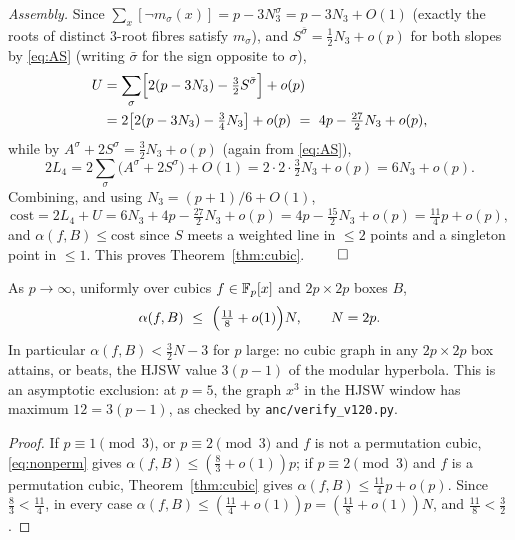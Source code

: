 \smallskip\noindent\emph{Assembly.} Since $\sum_x[\neg m_\sigma(x)]=p-3N_3^\sigma=p-3N_3+O(1)$ (exactly the roots of
distinct $3$-root fibres satisfy $m_\sigma$), and $S^{\bar\sigma}=\tfrac12N_3+o(p)$
for both slopes by \eqref{eq:AS} (writing $\bar\sigma$ for the sign opposite to $\sigma$),
\begin{align*}
U&=\sum_\sigma\Bigl[2(p-3N_3)-\tfrac32S^{\bar\sigma}\Bigr]+o(p)\\
&=2\bigl[2(p-3N_3)-\tfrac34N_3\bigr]+o(p)\ =\ 4p-\tfrac{27}2N_3+o(p),
\end{align*}
while by $A^\sigma+2S^\sigma=\tfrac32N_3+o(p)$ (again from \eqref{eq:AS}),
\[
2L_4=2\sum_\sigma\bigl(A^\sigma+2S^\sigma\bigr)+O(1)=2\cdot2\cdot\tfrac32N_3+o(p)=6N_3+o(p).
\]
Combining, and using $N_3=(p+1)/6+O(1)$,
\[
\mathrm{cost}=2L_4+U=6N_3+4p-\tfrac{27}2N_3+o(p)=4p-\tfrac{15}2N_3+o(p)=\tfrac{11}4p+o(p),
\]
and $\alpha(f,B)\le\mathrm{cost}$ since $S$ meets a weighted line in $\le2$ points and a singleton point in $\le1$.
This proves Theorem~\ref{thm:cubic}. $\qed$

\begin{corollary}\label{cor:cubic}
As $p\to\infty$, uniformly over cubics $f\in\mathbb{F}_p[x]$ and $2p\times2p$ boxes $B$,
\[
\alpha(f,B)\ \le\ \Bigl(\tfrac{11}8+o(1)\Bigr)N,\qquad N=2p.
\]
In particular $\alpha(f,B)<\tfrac32N-3$ for $p$ large: no cubic graph in any $2p\times2p$ box attains, or beats, the
HJSW value $3(p-1)$ of the modular hyperbola.  This is an asymptotic exclusion: at $p=5$, the graph $x^3$ in the HJSW window has maximum $12=3(p-1)$, as checked by \texttt{anc/verify\_v120.py}.
\end{corollary}
\begin{proof}
If $p\equiv1\pmod3$, or $p\equiv2\pmod3$ and $f$ is not a permutation cubic, \eqref{eq:nonperm} gives
$\alpha(f,B)\le(\tfrac83+o(1))p$; if $p\equiv2\pmod3$ and $f$ is a permutation cubic, Theorem~\ref{thm:cubic} gives
$\alpha(f,B)\le\tfrac{11}4p+o(p)$. Since $\tfrac83<\tfrac{11}4$, in every case
$\alpha(f,B)\le(\tfrac{11}4+o(1))p=(\tfrac{11}8+o(1))N$, and $\tfrac{11}8<\tfrac32$.
\end{proof}

